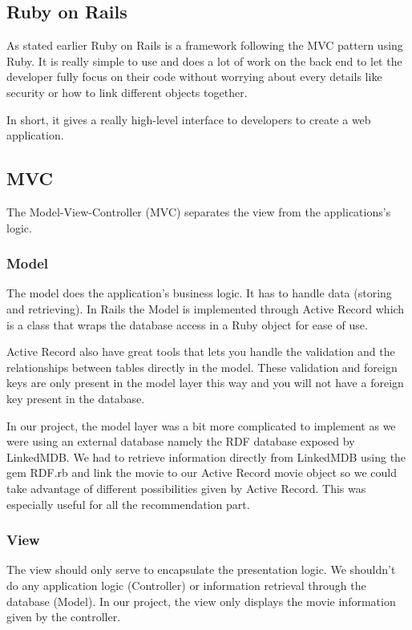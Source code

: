 \documentclass[12pt,a4paper]{article}
\begin{document}
\subsection{Ruby on Rails}
As stated earlier Ruby on Rails is a framework following the MVC pattern using Ruby. It is really simple to use and does a lot of work on the back end to let the developer fully focus on their code without worrying about every details like security or how to link different objects together.

In short, it gives a really high-level interface to developers to create a web application.
\subsection{MVC}
The Model-View-Controller (MVC) separates the view from the applications's logic.

\subsubsection{Model}
The model does the application's business logic. It has to handle data (storing and retrieving). In Rails the Model is implemented through Active Record which is a class that wraps the database access in a Ruby object for ease of use.

Active Record also have great tools that lets you handle the validation and the relationships between tables directly in the model. These validation and foreign keys are only present in the model layer this way and you will not have a foreign key present in the database.

In our project, the model layer was a bit more complicated to implement as we were using an external database namely the RDF database exposed by LinkedMDB. We had to retrieve information directly from LinkedMDB using the gem RDF.rb and link the movie to our Active Record movie object so we could take advantage of different possibilities given by Active Record. This was especially useful for all the recommendation part.

\subsubsection{View}
The view should only serve to encapsulate the presentation logic. We shouldn't do any application logic (Controller) or information retrieval through the database (Model). In our project, the view only displays the movie information given by the controller.
\end{document}
